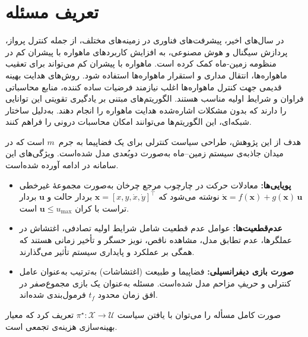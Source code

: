 \section{تعریف مسئله}\label{sec:problem_statement}
\noindent  در سال‌های اخیر، پیشرفت‌های فناوری در زمینه‌های مختلف، از جمله کنترل پرواز، پردازش سیگنال و هوش مصنوعی، به افزایش کاربردهای ماهواره با پیشران کم در منظومه زمین‐ماه کمک کرده است. ماهواره با پیشران کم می‌تواند برای تعقیب ماهواره‌ها، انتقال مداری و استقرار ماهواره‌ها استفاده شود.
روش‌های هدایت بهینه قدیمی جهت کنترل ماهواره‌ها اغلب نیازمند فرضیات ساده کننده، منابع محاسباتی فراوان و شرایط اولیه مناسب هستند. الگوریتم‌های مبتنی بر یادگیری تقویتی این توانایی را دارند که بدون مشکلات اشاره‌شده هدایت ماهواره را انجام دهند. به‌دلیل ساختار شبکه‌ای، این الگوریتم‌ها می‌توانند امکان محاسبات درونی  
را فراهم کنند.



هدف از این پژوهش، طراحی سیاست کنترلی برای یک فضاپیما به جرم~$m$ است که در میدان جاذبه‌ی سیستم زمین–ماه به‌صورت دوبُعدی مدل شده‌است. ویژگی‌های این سامانه در ادامه آورده شده‌است.

\begin{itemize}
	\item \textbf{پویایی‌ها:} معادلات حرکت در چارچوب مرجع چرخان به‌صورت مجموعهٔ غیرخطی {$\dot{\boldsymbol{x}} = f(\boldsymbol{x}) + g(\boldsymbol{x})\,\boldsymbol{u}$} نوشته می‌شود که $\boldsymbol{x}\!=\![x,y,\dot x,\dot y]^\top$ بردار حالت و $\boldsymbol{u}$ بردار تراست با کران $\boldsymbol{u}\le u_{\max}$ است.
	\item \textbf{عدم‌قطعیت‌ها:} 
عوامل عدم قطعیت شامل شرایط اولیه تصادفی، اغتشاش در عملگرها، عدم تطابق مدل، مشاهده ناقص، نویز حسگر و تأخیر زمانی هستند که همگی بر عملکرد و پایداری سیستم تأثیر می‌گذارند.
	
	\item \textbf{صورت بازی دیفرانسیلی:} فضاپیما و طبیعت (اغتشاشات) به‌ترتیب به‌عنوان عامل کنترلی و حریفِ مزاحم مدل شده‌است. مسئله به‌عنوان یک بازی مجموع‌صفر  
	در افق زمان محدود {$t_f$} فرمول‌بندی شده‌اند.
\end{itemize}

صورت کامل مسأله را می‌توان با یافتن سیاست {$\pi^\star : \mathcal{X}\to \mathcal{U}$} تعریف کرد که معیار بهینه‌سازی هزینه‌ی تجمعی است.

